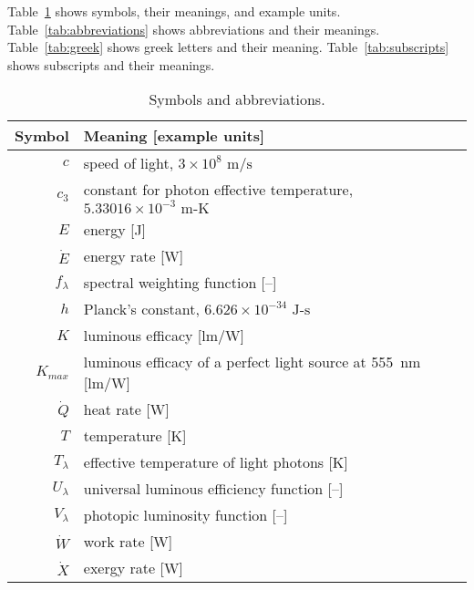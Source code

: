 
\noindent 
Table~\ref{tab:symbols} shows symbols, their meanings, and example units.
Table~\ref{tab:abbreviations} shows abbreviations and their meanings.
Table~\ref{tab:greek} shows greek letters and their meaning.
Table~\ref{tab:subscripts} shows subscripts and their meanings.


  
\begin{table}
\centering %
\caption{Symbols and abbreviations.}
\begin{tabular}{r l}
\toprule
Symbol & Meaning [example units] \\
\midrule
$c$ & speed of light, $3 \times 10^8 \text{ m/s}$ \\
$c_3$ & constant for photon effective temperature, $5.33016 \times 10^{-3} \text{ m-K}$ \\
$E$ & energy [J] \\
$\dot{E}$ & energy rate [W] \\
$f_\lambda$ & spectral weighting function [--] \\
$h$ & Planck's constant, $6.626 \times 10^{-34} \text{ J-s}$ \\
$K$ & luminous efficacy [lm/W] \\
$K_{max}$ & luminous efficacy of a perfect light source at 555~nm [lm/W] \\
$\dot{Q}$ & heat rate [W] \\
$T$ & temperature [K] \\
$T_\lambda$ & effective temperature of light photons [K] \\
$U_\lambda$ & universal luminous efficiency function [--] \\
$V_\lambda$ & photopic luminosity function [--] \\
$\dot{W}$ & work rate [W] \\
$\dot{X}$ & exergy rate [W] \\
\bottomrule
\end{tabular}
\label{tab:symbols}
\end{table}


  
